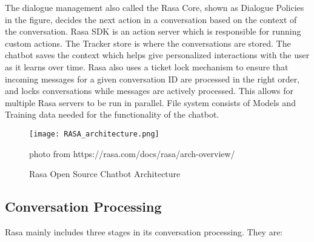 The dialogue management also called the Rasa Core, shown as Dialogue Policies in the figure, decides the next action in a conversation based on the context of the conversation. Rasa SDK is an action server which is responsible for running custom actions. The Tracker store is where the conversations are stored. The chatbot saves the context which helps give personalized interactions with the user as it learns over time. Rasa also uses a ticket lock mechanism to ensure that incoming messages for a given conversation ID are processed in the right order, and locks conversations while messages are actively processed. This allows for multiple Rasa servers to be run in parallel. File system consists of Models and Training data needed for the functionality of the chatbot.

\newpage

\begin{figure}[h]
	\centering 
	\texttt{[image: RASA\_architecture.png]}
	\caption{Rasa Open Source Chatbot Architecture}
	photo from https://rasa.com/docs/rasa/arch-overview/
	\label{fig:rasa_architecture}
\end{figure}

\subsection {Conversation Processing}

Rasa mainly includes three stages in its conversation processing. They are:

